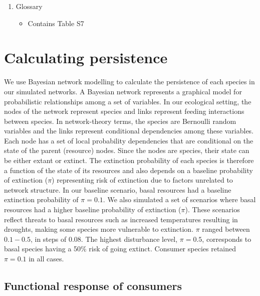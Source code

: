 \documentclass[12pt]{article}
\begin{document}
\begin{spacing}{2.0}
{\begin{spacing}{1.0}
\begin{enumerate}
        \item Glossary    

            \begin{itemize}
                \item Contains Table S7
            \end{itemize}


    \end{enumerate}    
\end{spacing}
}
\clearpage

\linenumbers
\section{Calculating persistence}        

        We use Bayesian network modelling to calculate the persistence of each species in our simulated networks. 
        A Bayesian network represents a graphical model for probabilistic relationships among a set of variables. 
        In our ecological setting, the nodes of the network represent species and links represent feeding interactions between species.
        In network-theory terms, the species are Bernoulli random variables and the links represent conditional dependencies among these variables. 
        Each node has a set of local probability dependencies that are conditional on the state of the parent (resource) nodes. 
        Since the nodes are species, their state can be either extant or extinct.
        The extinction probability of each species is therefore a function of the state of its resources and also depends on a baseline probability of extinction ($\pi$) representing risk of extinction due to factors unrelated to network structure.
        In our baseline scenario, basal resources had a baseline extinction probability of $\pi = 0.1$. 
        We also simulated a set of scenarios where basal resources had a higher baseline probability of extinction ($\pi$). 
        These scenarios reflect threats to basal resources such as increased temperatures resulting in droughts, making some species more vulnerable to extinction.
        $\pi$ ranged between $0.1-0.5$, in steps of $0.08$. 
        The highest disturbance level, $\pi = 0.5$, corresponds to basal species having a 50\% risk of going extinct. 
        Consumer species retained $\pi=0.1$ in all cases.


    \subsection{Functional response of consumers}


\end{spacing}
\end{document}
